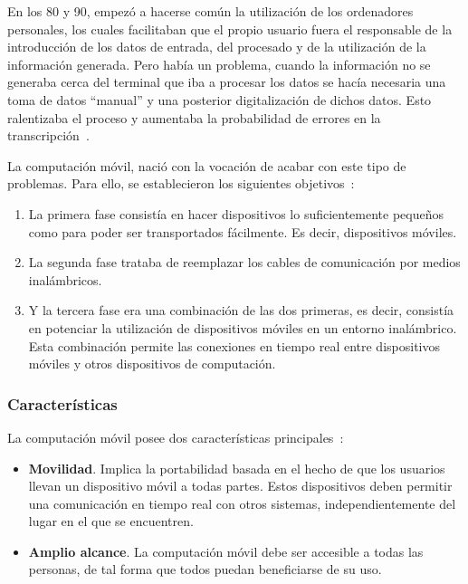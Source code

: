 En los 80 y 90, empezó a hacerse común la utilización de los ordenadores
personales, los cuales facilitaban que el propio usuario fuera el responsable
de la introducción de los datos de entrada, del procesado y de la utilización
de la información generada. Pero había un problema, cuando la información no
se generaba cerca del terminal que iba a procesar los datos se hacía necesaria
una toma de datos ``manual'' y una posterior digitalización de dichos datos.
Esto ralentizaba el proceso y aumentaba la probabilidad de errores en la
transcripción~\cite{bib:micMobileComputing}.

La computación móvil, nació con la vocación de acabar con este tipo de 
problemas. Para ello, se establecieron los siguientes
objetivos~\cite{bib:ticUTP}:
\begin{enumerate}
\item La primera fase consistía en hacer dispositivos lo suficientemente
pequeños como para poder ser transportados fácilmente. Es decir, dispositivos
móviles.
\item La segunda fase trataba de reemplazar los cables de comunicación por
medios inalámbricos.
\item Y la tercera fase era una combinación de las dos primeras, es decir,
consistía en potenciar la utilización de dispositivos móviles en un entorno
inalámbrico. Esta combinación permite las conexiones en tiempo real entre
dispositivos móviles y otros dispositivos de computación.
\end{enumerate}

  \subsubsection{Características}
La computación móvil posee dos características principales~\cite{bib:ticUTP}:
\begin{itemize}
\item \textbf{Movilidad}. Implica la portabilidad basada en el hecho de que
los usuarios llevan un dispositivo móvil a todas partes. Estos dispositivos
deben permitir una comunicación en tiempo real con otros sistemas,
independientemente del lugar en el que se encuentren.
\item \textbf{Amplio alcance}. La computación móvil debe ser accesible a todas
las personas, de tal forma que todos puedan beneficiarse de su uso.
\end{itemize}

